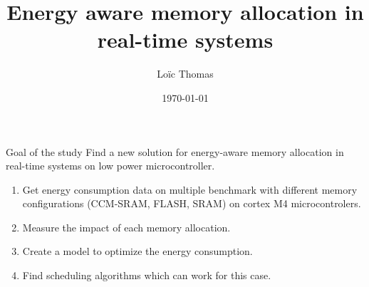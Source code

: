 \documentclass[
	11pt, %
]{beamer}
\title[]{Energy aware memory allocation in real-time systems} %
\subtitle{} %
\author[]{Loïc Thomas} %
\institute[]{LAAS CNRS - VERTICS \\ \smallskip  \textit{l\_thomas@insa-toulouse.fr}} %
\date[\today]{\today} %
\begin{document}

\begin{frame}
	\titlepage %
\end{frame}




\begin{frame}{Goal of the study}
	Find a new solution for energy-aware memory allocation in real-time systems on low power microcontroller.
	\begin{enumerate}
		\item Get energy consumption data on multiple benchmark with different memory configurations (CCM-SRAM, FLASH, SRAM) on cortex M4 microcontrolers.
		\item Measure the impact of each memory allocation.
		\item Create a model to optimize the energy consumption.
		\item Find scheduling algorithms which can work for this case.
	\end{enumerate}
\end{frame}
\end{document}
